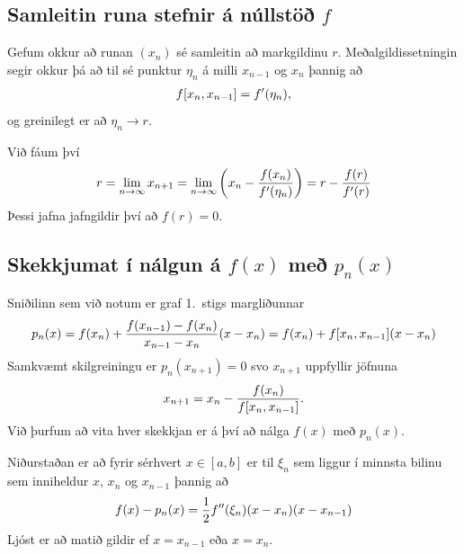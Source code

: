 \documentclass[A4paper,10pt,icelandic]{sphinxmanual}
\begin{document}
\subsection{Samleitin runa stefnir á núllstöð \(f\)}
\label{kafli02:samleitin-runa-stefnir-a-nullsto}
Gefum okkur að runan \((x_n)\) sé samleitin að markgildinu
\(r\). Meðalgildissetningin segir okkur þá að til sé punktur
\(\eta_n\) á milli \(x_{n-1}\) og \(x_n\) þannig að
\begin{gather}
\begin{split}f[x_n,x_{n-1}]=f'(\eta_n),\end{split}\notag
\end{gather}
og greinilegt er að \(\eta_n\to r\).

Við fáum því
\begin{gather}
\begin{split}r=\lim_{n\to \infty}x_{n+1}=\lim_{n\to \infty}
\bigg(x_n-\dfrac{f(x_n)}{f'(\eta_n)}\bigg) =r-\dfrac{f(r)}{f'(r)}\end{split}\notag
\end{gather}
Þessi jafna jafngildir því að \(f(r)=0\).


\subsection{Skekkjumat í nálgun á \(f(x)\) með \(p_n(x)\)}
\label{kafli02:skekkjumat-i-nalgun-a-me}
Sniðilinn sem við notum er graf 1. stigs margliðunnar
\begin{gather}
\begin{split}p_n(x) = f(x_n) +
        \dfrac{f(x_{n-1})-f(x_n)}{x_{n-1}-x_n}(x-x_n)
        = f(x_n) + f[x_n,x_{n-1}](x-x_n)\end{split}\notag
\end{gather}
Samkvæmt skilgreiningu er \(p_n(x_{n+1}) = 0\) svo \(x_{n+1}\)
uppfyllir jöfnuna
\begin{gather}
\begin{split}x_{n+1} = x_n - \frac{f(x_n)}{f[x_n,x_{n-1}]}.\end{split}\notag
\end{gather}
Við þurfum að vita hver skekkjan er á því að nálga \(f(x)\) með
\(p_n(x)\).

Niðurstaðan er að fyrir sérhvert \(x \in [a,b]\) er til
\(\xi_n\) sem liggur í minnsta bilinu sem inniheldur \(x\),
\(x_n\) og \(x_{n-1}\) þannig að
\begin{gather}
\begin{split}f(x) - p_n(x) = \frac{1}{2}f''(\xi_n)(x-x_n)(x-x_{n-1})\end{split}\notag
\end{gather}
Ljóst er að matið gildir ef \(x=x_{n-1}\) eða \(x=x_n\).
\end{document}
